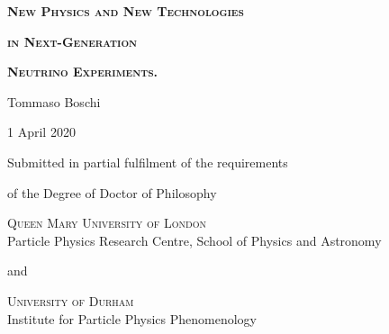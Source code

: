 
\begin{center}

	\vspace*{10em}

	\textsc{\Huge \bfseries New Physics and New Technologies}

	\bigskip
	\textsc{\Huge \bfseries in Next-Generation}

	\bigskip
	\textsc{\Huge \bfseries Neutrino Experiments.}

	\vfill
	{\huge Tommaso Boschi}

	\medskip
	{\Large 1 April 2020}

	\vfill
	{\large
	Submitted in partial fulfilment of the requirements

	of the Degree of Doctor of Philosophy}

	\vfill
	{\Large
	\textsc{Queen Mary University of London} \\
	Particle Physics Research Centre, School of Physics and Astronomy}

	\bigskip
	{\large and}

	\bigskip
	{\Large
	\textsc{University of Durham} \\ 
	Institute for Particle Physics Phenomenology}
	\vspace*{8em}

\end{center}

\restoregeometry
\clearpage


\afterpage{\null\newpage}


